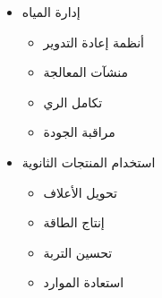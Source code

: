 \begin{itemize}
\begin{itemize}
        \item إدارة المياه
        \begin{itemize}
            \item أنظمة إعادة التدوير
            \item منشآت المعالجة
            \item تكامل الري
            \item مراقبة الجودة
        \end{itemize}
        
        \item استخدام المنتجات الثانوية
        \begin{itemize}
            \item تحويل الأعلاف
            \item إنتاج الطاقة
            \item تحسين التربة
            \item استعادة الموارد
        \end{itemize}
    \end{itemize}
\end{itemize}

